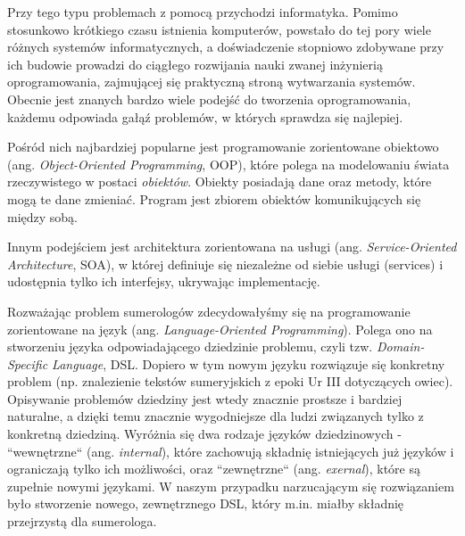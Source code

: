 Przy tego typu problemach z pomocą przychodzi informatyka. Pomimo stosunkowo krótkiego czasu istnienia komputerów, powstało do tej pory wiele różnych systemów informatycznych, a doświadczenie stopniowo zdobywane przy ich budowie prowadzi do ciągłego rozwijania nauki zwanej inżynierią oprogramowania, zajmującej się praktyczną stroną wytwarzania systemów. Obecnie jest znanych bardzo wiele podejść do tworzenia oprogramowania, każdemu odpowiada gałąź problemów, w których sprawdza się najlepiej. 

Pośród nich najbardziej popularne jest programowanie zorientowane obiektowo (ang. \emph{Object-Oriented Programming}, OOP), które polega na modelowaniu świata rzeczywistego w postaci \textit{obiektów}. Obiekty posiadają dane oraz metody, które mogą te dane zmieniać. Program jest zbiorem obiektów komunikujących się między sobą. 

Innym podejściem jest architektura zorientowana na usługi (ang. \emph{Service-Oriented Architecture}, SOA), w której definiuje się niezależne od siebie usługi (services) i udostępnia tylko ich interfejsy, ukrywając implementację.

Rozważając problem sumerologów zdecydowałyśmy się na programowanie zorientowane na język (ang. \emph{Language-Oriented Programming}). Polega ono na stworzeniu języka odpowiadającego dziedzinie problemu, czyli tzw. \emph{Domain-Specific Language}, DSL. Dopiero w tym nowym języku rozwiązuje się konkretny problem (np. znalezienie tekstów sumeryjskich z epoki Ur III dotyczących owiec). Opisywanie problemów dziedziny jest wtedy znacznie prostsze i bardziej naturalne, a dzięki temu znacznie wygodniejsze dla ludzi związanych tylko z konkretną dziedziną. 
Wyróżnia się dwa rodzaje języków dziedzinowych - ``wewnętrzne`` (ang. \emph{internal}), które zachowują składnię istniejących już języków i ograniczają tylko ich możliwości, oraz ``zewnętrzne`` (ang. \emph{exernal}), które są zupełnie nowymi językami. W naszym przypadku narzucającym się rozwiązaniem było stworzenie nowego, zewnętrznego DSL, który m.in. miałby składnię przejrzystą dla sumerologa. 

